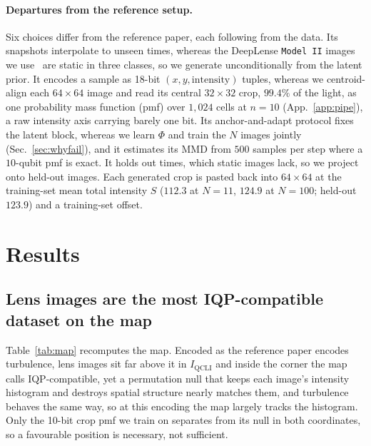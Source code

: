 \documentclass{article}
\newcommand{\qcli}{I_{\mathrm{QCLI}}}
\begin{document}
\paragraph{Departures from the reference setup.}
Six choices differ from the reference paper, each following from the data. Its snapshots interpolate
to unseen times, whereas the DeepLense \texttt{Model~II} images we
use~\cite{alexander_2020_deep,alexander_2023_domain,ml4sci_deeplense} are static in three classes, so
we generate unconditionally from the latent prior. It encodes a sample as 18-bit
$(x,y,\mathrm{intensity})$ tuples, whereas we centroid-align each $64\times64$ image and read its
central $32\times32$ crop, $99.4\%$ of the light, as one probability mass function (pmf) over
$1{,}024$ cells at $n=10$ (App.~\ref{app:pipe}), a raw intensity axis carrying barely one bit. Its
anchor-and-adapt protocol fixes the latent block, whereas we learn $\Phi$ and train the $N$ images
jointly (Sec.~\ref{sec:whyfail}), and it estimates its MMD from $500$ samples per step where a
$10$-qubit pmf is exact. It holds out times, which static images lack, so we project onto held-out
images. Each generated crop is pasted back into $64\times64$ at the training-set mean total intensity
$S$ ($112.3$ at $N{=}11$, $124.9$ at $N{=}100$; held-out $123.9$) and a training-set offset.

\section{Results}
\label{sec:results}

\subsection{Lens images are the most IQP-compatible dataset on the map}
\label{sec:map}

Table~\ref{tab:map} recomputes the map. Encoded as the reference paper encodes turbulence, lens
images sit far above it in $\qcli$ and inside the corner the map calls IQP-compatible, yet a
permutation null that keeps each image's intensity histogram and destroys spatial structure nearly
matches them, and turbulence behaves the same way, so at this encoding the map largely tracks the
histogram. Only the 10-bit crop pmf we train on separates from its null in both coordinates, so a
favourable position is necessary, not sufficient.
\end{document}

